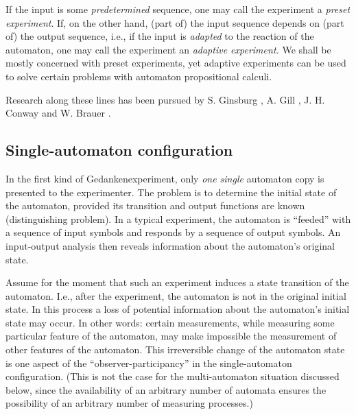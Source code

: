 \documentclass{article}
\begin{document}
 If the input is some {\em predetermined} sequence, one may call
 the experiment a {\em preset experiment}. If, on the other hand, (part
 of) the
 input sequence depends on (part of) the output sequence, i.e., if the
 input is {\em adapted} to the reaction of the automaton, one may call
 the experiment an {\em adaptive experiment.}
We shall be mostly concerned with preset experiments, yet adaptive
experiments can be used to solve certain problems with automaton
propositional calculi.

 Research along these lines has been pursued by S. Ginsburg
 \cite{ginsburg-58},  A. Gill \cite{gill-61},
 J. H. Conway \cite{conway} and
 W. Brauer \cite{brauer-84}.



 \subsection{Single-automaton configuration}

 In the first kind of Gedankenexperiment,
 only {\em one single}
 automaton copy is presented to the experimenter.
 The problem is to determine the initial state of the
 automaton, provided its transition and output
 functions are known (distinguishing problem).
 In a typical experiment, the  automaton
 is ``feeded'' with a sequence of input symbols
 and responds by a sequence of output symbols.
 An input-output analysis then reveals information about the
 automaton's original state.

 Assume for the moment that such an
 experiment  induces a state
 transition of the automaton. I.e., after the experiment, the
 automaton is not in the
 original initial state. In this process a loss of potential
 information about the automaton's initial state may occur.
 In other words:
 certain measurements, while measuring
 some particular feature of the automaton, may make impossible the
 measurement of other features of the automaton.
 This irreversible change of the automaton state  is one aspect
 of the ``observer-participancy'' in the single-automaton
 configuration.
 (This is not the case for the multi-automaton situation discussed
 below, since the availability of an arbitrary number of automata
 ensures the possibility of an arbitrary number of
 measuring processes.)
\end{document}
